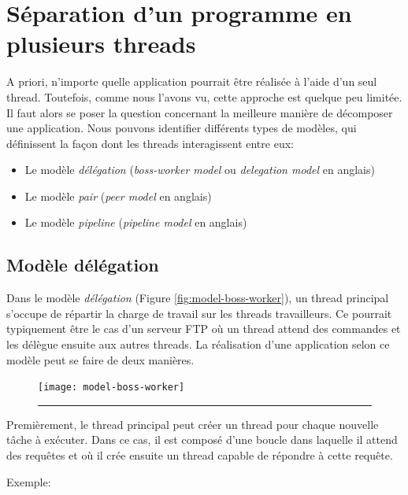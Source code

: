 \section{Séparation d'un programme en plusieurs threads}

A priori, n'importe quelle application pourrait être réalisée à l'aide d'un seul thread. Toutefois, comme nous l'avons vu, cette approche est quelque peu limitée. Il faut alors se poser la question concernant la meilleure manière de décomposer une application. Nous pouvons identifier différents types de modèles, qui définissent la façon dont les threads interagissent entre eux:

\begin{itemize}
\item Le modèle \emph{délégation} (\emph{boss-worker model} ou \emph{delegation model} en anglais)
\item Le modèle \emph{pair} (\emph{peer model} en anglais)
\item Le modèle \emph{pipeline} (\emph{pipeline model} en anglais)
\end{itemize}

\subsection{Modèle délégation}

Dans le modèle \emph{délégation} (Figure \ref{fig:model-boss-worker}), un thread principal s'occupe de répartir la charge de travail sur les threads travailleurs. Ce pourrait typiquement être le cas d'un serveur FTP où un thread attend des commandes et les délègue ensuite aux autres threads. La réalisation d'une application selon ce modèle peut se faire de deux manières.


\begin{figure}[ht]
\begin{center}
\texttt{[image: model-boss-worker]}
\end{center}
\vspace{-.3cm}
\rule{\textwidth}{0.01in}
\end{figure}

Premièrement, le thread principal peut créer un thread pour chaque nouvelle tâche à exécuter. Dans ce cas, il est composé d'une boucle dans laquelle il attend des requêtes et où il crée ensuite un thread capable de répondre à cette requête.

\newpage

Exemple:

